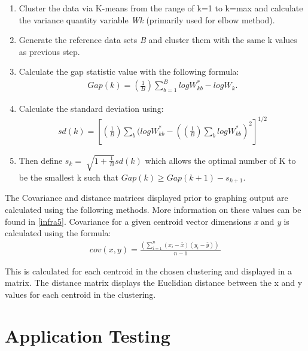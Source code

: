 \begin{enumerate}

\item Cluster the data via K-means from the range of k=1 to k=max and calculate the variance quantity variable \textit{Wk} (primarily used for elbow method).
\item Generate the reference data sets \textit{B} and cluster them with the same k values as previous step. 
\item Calculate the gap statistic value with the following formula: \linebreak
\begin{align*}
Gap\left( k \right) = \left( {\frac{1}{B}} \right)\mathop \sum \limits_{b = 1}^B logW_{kb}^* - log{W_k}.
\end{align*}
\item Calculate the standard deviation using: \linebreak
\begin{align*}
sd\left( k \right) = {\left[ {\left( {\frac{1}{B}} \right)\mathop \sum \limits_b (logW_{kb}^* - {{(\left( {\frac{1}{B}} \right)\mathop \sum \limits_b logW_{kb}^*)}^2}} \right]^{1/2}}
\end{align*}
\item Then define ${s_k} = \;\sqrt {1 + \frac{1}{B}} sd\left( k \right)$ which allows the optimal number of K to be the smallest k such that $Gap\left( k \right) \ge Gap\left( {k + 1} \right) - {s_{k + 1}}$. 

\end{enumerate}

The Covariance and distance matrices displayed prior to graphing output are calculated using the following methods. More information on these values can be found in \ref{infra5}.
Covariance for a given centroid vector dimensions \textit{x} and \textit{y} is calculated using the formula: 
\begin{align*}
cov\left( {x,y} \right) = \frac{{(\mathop \sum \nolimits_{i = 1}^n \left( {{x_i} - \bar x} \right)\left( {{y_i} - \bar y} \right))\;}}{{n - 1}}
\end{align*}

This is calculated for each centroid in the chosen clustering and displayed in a matrix.
The distance matrix displays the Euclidian distance between the x and y values for each centroid in the clustering.

\section{Application Testing}
\label{testing}
